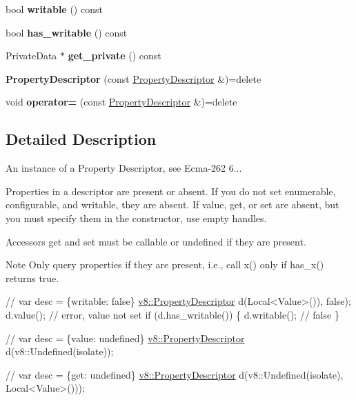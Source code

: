 \begin{DoxyCompactItemize}
bool {\bfseries writable} () const
\item 
\mbox{\label{classv8_1_1PropertyDescriptor_a3d348233abc24c49daf8770e714e39e1}} 
bool {\bfseries has\+\_\+writable} () const
\item 
\mbox{\label{classv8_1_1PropertyDescriptor_aea136ecc07fdc9483e007f4bc4c45e3e}} 
Private\+Data $\ast$ {\bfseries get\+\_\+private} () const
\item 
\mbox{\label{classv8_1_1PropertyDescriptor_ab06b5924a188d744797c44952d154fce}} 
{\bfseries Property\+Descriptor} (const \mbox{\hyperlink{classv8_1_1PropertyDescriptor}{Property\+Descriptor}} \&)=delete
\item 
\mbox{\label{classv8_1_1PropertyDescriptor_a924fcc63be20f822bdaacdd7bc967805}} 
void {\bfseries operator=} (const \mbox{\hyperlink{classv8_1_1PropertyDescriptor}{Property\+Descriptor}} \&)=delete
\end{DoxyCompactItemize}


\subsection{Detailed Description}
An instance of a Property Descriptor, see Ecma-\/262 6...

Properties in a descriptor are present or absent. If you do not set {\ttfamily enumerable}, {\ttfamily configurable}, and {\ttfamily writable}, they are absent. If {\ttfamily value}, {\ttfamily get}, or {\ttfamily set} are absent, but you must specify them in the constructor, use empty handles.

Accessors {\ttfamily get} and {\ttfamily set} must be callable or undefined if they are present.

\begin{DoxyNote}{Note}
Only query properties if they are present, i.\+e., call {\ttfamily x()} only if {\ttfamily has\+\_\+x()} returns true.
\end{DoxyNote}

\begin{DoxyCode}
\textcolor{comment}{// var desc = \{writable: false\}}
\mbox{\hyperlink{classv8_1_1PropertyDescriptor}{v8::PropertyDescriptor}} d(Local<Value>()), \textcolor{keyword}{false});
d.value(); \textcolor{comment}{// error, value not set}
\textcolor{keywordflow}{if} (d.has\_writable()) \{
  d.writable(); \textcolor{comment}{// false}
\}

\textcolor{comment}{// var desc = \{value: undefined\}}
\mbox{\hyperlink{classv8_1_1PropertyDescriptor}{v8::PropertyDescriptor}} d(v8::Undefined(isolate));

\textcolor{comment}{// var desc = \{get: undefined\}}
\mbox{\hyperlink{classv8_1_1PropertyDescriptor}{v8::PropertyDescriptor}} d(v8::Undefined(isolate), Local<Value>()));
\end{DoxyCode}
 

